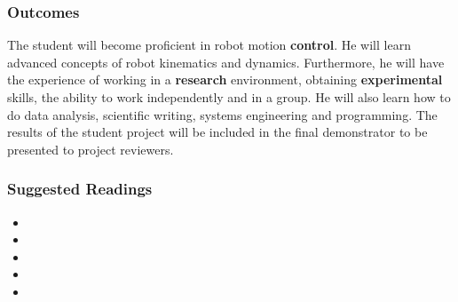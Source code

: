 \subsubsection{Outcomes}
The student will become proficient in robot motion \textbf{control}. He will learn advanced concepts of robot kinematics and dynamics.
Furthermore, he will have the experience of working in a \textbf{research} environment, obtaining \textbf{experimental} skills, the ability to work independently and in a group. He will also learn how to do data analysis, scientific writing, systems engineering and programming.
The results of the student project will be included in the final demonstrator to be presented to project reviewers.

\subsubsection{Suggested Readings}
\begin{itemize}
\item	{}
\item	{}
\item	{}
\item	{}
\item	{}


\end{itemize}
